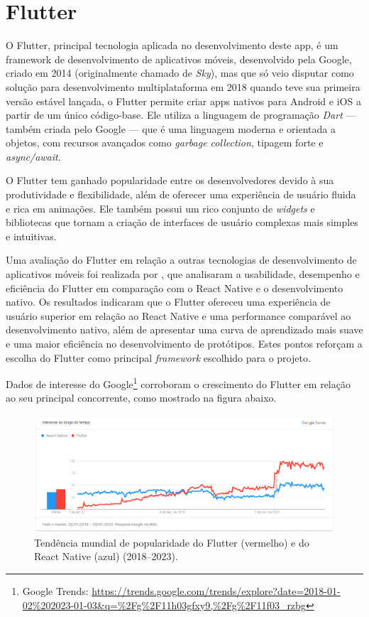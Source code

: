 \section{Flutter}\label{sec:flutter}
O Flutter, principal tecnologia aplicada no desenvolvimento deste \ac{app}, é um framework de desenvolvimento de aplicativos móveis, desenvolvido pela Google, criado em 2014 (originalmente chamado de \textit{Sky}), mas que só veio disputar como solução para desenvolvimento multiplataforma em 2018 quando teve sua primeira versão estável lançada, o Flutter permite criar \acp{app} nativos para Android e iOS a partir de um único código-base. Ele utiliza a linguagem de programação \textit{Dart} — também criada pelo Google — que é uma linguagem moderna e orientada a objetos, com recursos avançados como \textit{garbage collection}, tipagem forte e \textit{async/await}.

O Flutter tem ganhado popularidade entre os desenvolvedores devido à sua produtividade e flexibilidade, além de oferecer uma experiência de usuário fluida e rica em animações. Ele também possui um rico conjunto de \textit{widgets} e bibliotecas que tornam a criação de interfaces de usuário complexas mais simples e intuitivas.

Uma avaliação do Flutter em relação a outras tecnologias de desenvolvimento de aplicativos móveis foi realizada por \cite{Zhou2021}, que analisaram a usabilidade, desempenho e eficiência do Flutter em comparação com o React Native e o desenvolvimento nativo. Os resultados indicaram que o Flutter ofereceu uma experiência de usuário superior em relação ao React Native e uma performance comparável ao desenvolvimento nativo, além de apresentar uma curva de aprendizado mais suave e uma maior eficiência no desenvolvimento de protótipos. Estes pontos reforçam a escolha do Flutter como principal \textit{framework} escolhido para o projeto.

Dados de interesse do Google\footnote{\label{google_trends_flutter_react}Google Trends: \url{https://trends.google.com/trends/explore?date=2018-01-02\%202023-01-03&q=\%2Fg\%2F11h03gfxy9,\%2Fg\%2F11f03_rzbg}} corroboram o crescimento do Flutter em relação ao seu principal concorrente, como mostrado na figura abaixo.

\begin{figure}[h]
\centering
  \includegraphics[width=\columnwidth]{images/interesse_flutter_react.png}
  \caption{Tendência mundial de popularidade do Flutter (vermelho) e do React Native (azul) (2018–2023).}
  \label{fig:interesse_flutter_react}
\end{figure}

